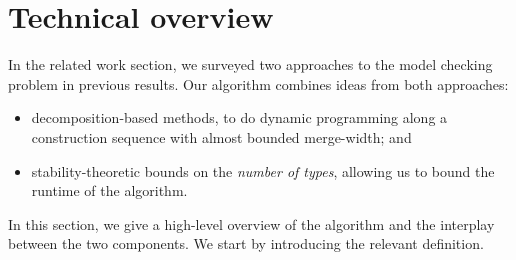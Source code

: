 \section{Technical overview}
\label{sec:tech-overview}

In the related work section, we surveyed two approaches to the model checking problem in previous results.
Our algorithm combines ideas from both approaches:
\begin{itemize}
  \item[--] decomposition-based methods, to do dynamic programming along a construction sequence with almost bounded merge-width; and
  \item[--]  stability-theoretic bounds on the \emph{number of types}, allowing us to bound the runtime of the algorithm.
\end{itemize}
In this section, we give a high-level overview of the algorithm and the interplay between the two components.
We start by introducing the relevant definition.

